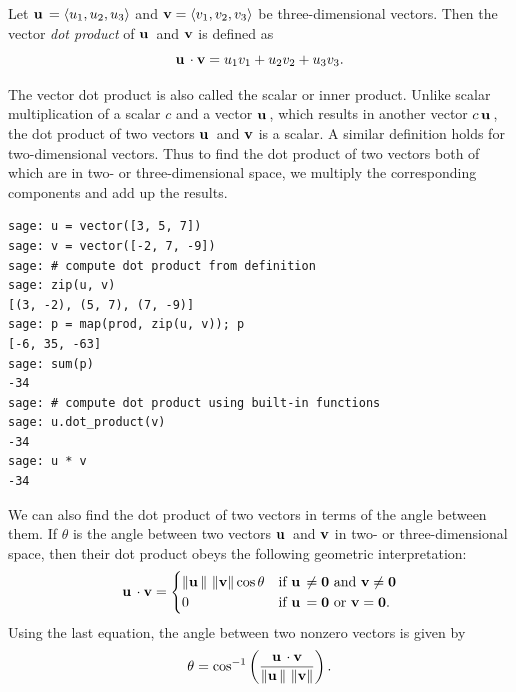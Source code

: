 \begin{definition}
\label{def:vectors_matrices:vector_dot_product}
Let $\operatorname*{\mathbf{u}}{} = \langle u_1, u_2, u_3 \rangle$ and
$\operatorname*{\mathbf{v}} = \langle v_1, v_2, v_3 \rangle$ be
three-dimensional vectors. Then the vector
\emph{dot product} of $\operatorname*{\mathbf{u}}{}$ and $\operatorname*{\mathbf{v}}$ is
defined as
\[
\operatorname*{\mathbf{u}}{} \cdot \operatorname*{\mathbf{v}}
=
u_1 v_1 + u_2 v_2 + u_3 v_3.
\]
\end{definition}

The vector dot product is also called the
scalar or inner
product. Unlike scalar multiplication of a scalar $c$ and a vector
$\operatorname*{\mathbf{u}}{}$, which results in another vector $c\operatorname*{\mathbf{u}}{}$, the dot product of
two vectors $\operatorname*{\mathbf{u}}{}$ and $\operatorname*{\mathbf{v}}$ is a scalar. A similar definition
holds for two-dimensional vectors. Thus to find the dot product of two
vectors both of which are in two- or three-dimensional space, we
multiply the corresponding components and add up the results.

\begin{lstlisting}
sage: u = vector([3, 5, 7])
sage: v = vector([-2, 7, -9])
sage: # compute dot product from definition
sage: zip(u, v)
[(3, -2), (5, 7), (7, -9)]
sage: p = map(prod, zip(u, v)); p
[-6, 35, -63]
sage: sum(p)
-34
sage: # compute dot product using built-in functions
sage: u.dot_product(v)
-34
sage: u * v
-34
\end{lstlisting}

We can also find the dot product of two vectors in terms of the
angle between them. If $\theta$ is the angle between two
vectors $\operatorname*{\mathbf{u}}{}$ and $\operatorname*{\mathbf{v}}$ in two- or three-dimensional space, then
their dot product obeys the following geometric interpretation:
%
\begin{equation}
\label{eq:vectors_matrices:geometric_interpretation_dot_product}
\operatorname*{\mathbf{u}}{} \cdot \operatorname*{\mathbf{v}}
=
\begin{cases}
\left\Arrowvert \operatorname*{\mathbf{u}}{} \right\Arrowvert \,
\left\Arrowvert \operatorname*{\mathbf{v}} \right\Arrowvert \cos\theta
&\text{if $\operatorname*{\mathbf{u}}{} \neq \operatorname*{\textbf{0}}$ and $\operatorname*{\mathbf{v}} \neq \operatorname*{\textbf{0}}$}\\
0 & \text{if $\operatorname*{\mathbf{u}}{} = \operatorname*{\textbf{0}}$ or $\operatorname*{\mathbf{v}} = \operatorname*{\textbf{0}}$}.
\end{cases}
\end{equation}
%
Using the last equation, the angle between two nonzero vectors is
given by
%
\begin{equation}
\label{eq:vectors_matrices:angle_between_vectors}
\theta
=
\cos^{-1}
\left(
\frac {\operatorname*{\mathbf{u}}{} \cdot \operatorname*{\mathbf{v}}}
{\left\Arrowvert \operatorname*{\mathbf{u}}{} \right\Arrowvert \, \left\Arrowvert \operatorname*{\mathbf{v}} \right\Arrowvert}
\right).
\end{equation}

